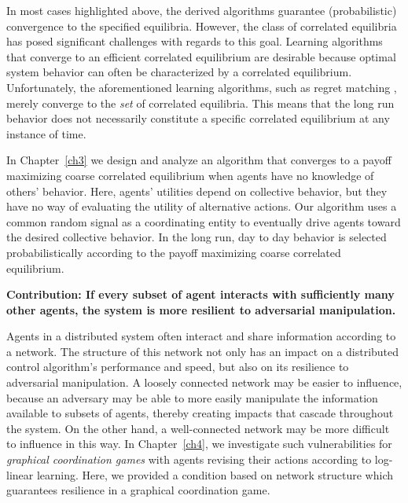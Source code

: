 In most cases highlighted above, the derived algorithms guarantee (probabilistic) convergence to the specified equilibria.  However, the class of correlated equilibria has posed significant challenges with regards to this goal. Learning algorithms that converge to an efficient correlated equilibrium are desirable because optimal system behavior can often be characterized by a correlated equilibrium. Unfortunately, the aforementioned learning algorithms, such as regret matching \cite{Hart2000}, merely converge to the \emph{set} of correlated equilibria. This means that the long run behavior does not necessarily constitute a specific correlated equilibrium at any instance of time.


In Chapter~\ref{ch3} we design and analyze an algorithm that converges to a payoff maximizing coarse correlated equilibrium when agents have no knowledge of others' behavior. Here, agents' utilities depend on collective behavior, but they have no way of evaluating the utility of alternative actions. Our algorithm uses a common random signal as a coordinating entity to eventually drive agents toward the desired collective behavior. In the long run, day to day behavior is selected probabilistically according to the payoff maximizing coarse correlated equilibrium.

 

\smallskip

 \noindent\textbf{Contribution: If every subset of agent interacts with sufficiently many other agents, the system is more resilient to adversarial manipulation.}


Agents in a distributed system often interact and share information according to a network. The structure of this network not only has an impact on a distributed control algorithm's performance and speed, but also on its resilience to adversarial manipulation. A loosely connected network may be easier to influence, because an adversary may be able to more easily manipulate the information available to subsets of agents, thereby creating impacts that cascade throughout the system. On the other hand, a well-connected network may be more difficult to influence in this way. In Chapter~\ref{ch4}, we investigate such vulnerabilities for  {\it graphical coordination games} \cite{Ullmann1977,Cooper1999} with agents revising their actions according to log-linear learning. Here, we provided a condition based on network structure which guarantees resilience in a graphical coordination game. 

